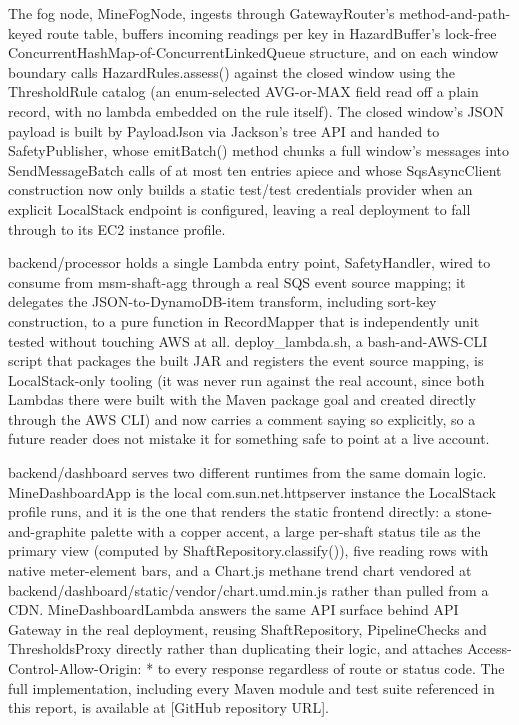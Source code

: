 \documentclass[conference]{IEEEtran}
\begin{document}
The fog node, MineFogNode, ingests through GatewayRouter's method-and-path-keyed route table, buffers incoming readings per key in HazardBuffer's lock-free ConcurrentHashMap-of-ConcurrentLinkedQueue structure, and on each window boundary calls HazardRules.assess() against the closed window using the ThresholdRule catalog (an enum-selected AVG-or-MAX field read off a plain record, with no lambda embedded on the rule itself). The closed window's JSON payload is built by PayloadJson via Jackson's tree API and handed to SafetyPublisher, whose emitBatch() method chunks a full window's messages into SendMessageBatch calls of at most ten entries apiece and whose SqsAsyncClient construction now only builds a static test/test credentials provider when an explicit LocalStack endpoint is configured, leaving a real deployment to fall through to its EC2 instance profile.

backend/processor holds a single Lambda entry point, SafetyHandler, wired to consume from msm-shaft-agg through a real SQS event source mapping; it delegates the JSON-to-DynamoDB-item transform, including sort-key construction, to a pure function in RecordMapper that is independently unit tested without touching AWS at all. deploy\_lambda.sh, a bash-and-AWS-CLI script that packages the built JAR and registers the event source mapping, is LocalStack-only tooling (it was never run against the real account, since both Lambdas there were built with the Maven package goal and created directly through the AWS CLI) and now carries a comment saying so explicitly, so a future reader does not mistake it for something safe to point at a live account.

backend/dashboard serves two different runtimes from the same domain logic. MineDashboardApp is the local com.sun.net.httpserver instance the LocalStack profile runs, and it is the one that renders the static frontend directly: a stone-and-graphite palette with a copper accent, a large per-shaft status tile as the primary view (computed by ShaftRepository.classify()), five reading rows with native meter-element bars, and a Chart.js methane trend chart vendored at backend/dashboard/static/vendor/chart.umd.min.js rather than pulled from a CDN. MineDashboardLambda answers the same API surface behind API Gateway in the real deployment, reusing ShaftRepository, PipelineChecks and ThresholdsProxy directly rather than duplicating their logic, and attaches Access-Control-Allow-Origin: * to every response regardless of route or status code. The full implementation, including every Maven module and test suite referenced in this report, is available at [GitHub repository URL].
\end{document}

